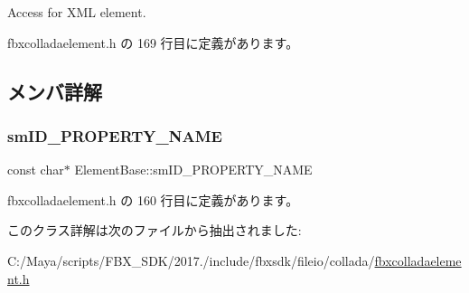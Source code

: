 Access for X\+ML element. 

 fbxcolladaelement.\+h の 169 行目に定義があります。



\subsection{メンバ詳解}
\mbox{\label{class_element_base_a9f75c1fda20fcc3c553e18c36be8221b}} 
\subsubsection{\texorpdfstring{sm\+I\+D\+\_\+\+P\+R\+O\+P\+E\+R\+T\+Y\+\_\+\+N\+A\+ME}{smID\_PROPERTY\_NAME}}
{\footnotesize\ttfamily const char$\ast$ Element\+Base\+::sm\+I\+D\+\_\+\+P\+R\+O\+P\+E\+R\+T\+Y\+\_\+\+N\+A\+ME\hspace{0.3cm}{\ttfamily [static]}}



 fbxcolladaelement.\+h の 160 行目に定義があります。



このクラス詳解は次のファイルから抽出されました\+:\begin{DoxyCompactItemize}
\item 
C\+:/\+Maya/scripts/\+F\+B\+X\+\_\+\+S\+D\+K/2017./include/fbxsdk/fileio/collada/\hyperlink{fbxcolladaelement_8h}{fbxcolladaelement.\+h}\end{DoxyCompactItemize}
